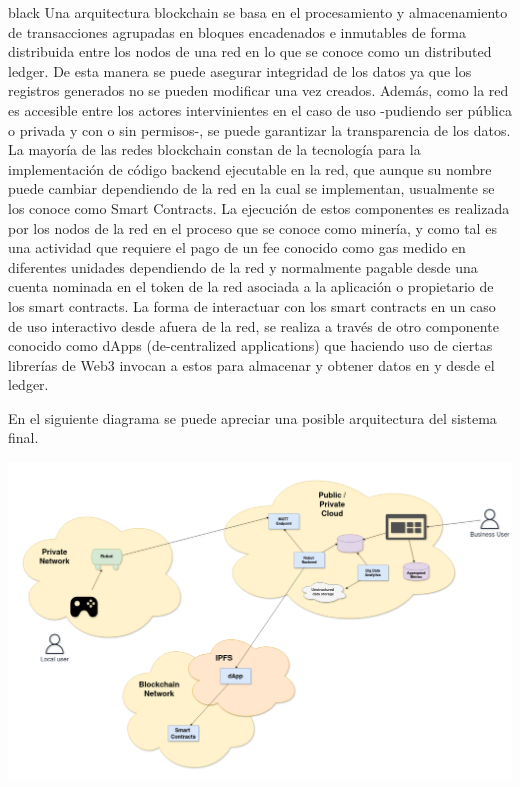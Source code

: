 \documentclass[
11pt, %
]{charter}
\begin{document}
\begin{consigna}{black}
Una arquitectura blockchain se basa en el procesamiento y almacenamiento de transacciones agrupadas en bloques encadenados e inmutables de forma distribuida entre los nodos de una red en lo que se conoce como un distributed ledger. De esta manera se puede asegurar integridad de los datos ya que los registros generados no se pueden modificar una vez creados. Además, como la red es accesible entre los actores intervinientes en el caso de uso -pudiendo ser pública o privada y con o sin permisos-, se puede garantizar la transparencia de los datos.
La mayoría de las redes blockchain constan de la tecnología para la implementación de código backend ejecutable en la red, que aunque su nombre puede cambiar dependiendo de la red en la cual se implementan, usualmente se los conoce como Smart Contracts. La ejecución de estos componentes es realizada por los nodos de la red en el proceso que se conoce como minería, y como tal es una actividad que requiere el pago de un fee conocido como gas medido en diferentes unidades dependiendo de la red y normalmente pagable desde una cuenta nominada en el token de la red asociada a la aplicación o propietario de los smart contracts. 
La  forma de interactuar con los smart contracts en un caso de uso interactivo desde afuera de la red, se realiza a través de otro componente conocido como dApps (de-centralized applications) que haciendo uso de ciertas librerías de Web3 invocan a estos para almacenar y obtener datos en y desde el ledger.

En el siguiente diagrama se puede apreciar una posible arquitectura del sistema final.



\begin{center}
   \includegraphics[scale=0.15]{Figuras/IoTProject-Page-1.drawio}
   \label{fig:esp32}
\end{center}





\end{consigna}
\end{document}
